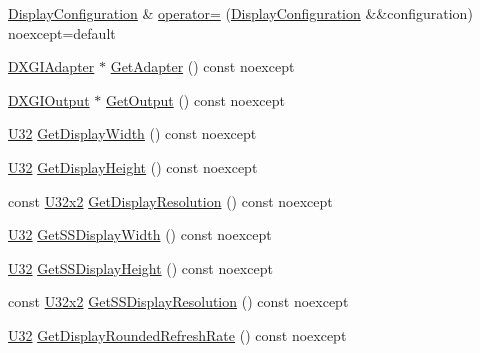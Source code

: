 \begin{DoxyCompactItemize}
\hyperlink{classmage_1_1rendering_1_1_display_configuration}{Display\+Configuration} \& \hyperlink{classmage_1_1rendering_1_1_display_configuration_a309591557673c77b7157012136fe2fc9}{operator=} (\hyperlink{classmage_1_1rendering_1_1_display_configuration}{Display\+Configuration} \&\&configuration) noexcept=default
\item 
\hyperlink{namespacemage_1_1rendering_ad55e028ebd705b547eeb972ad8d03b6a}{D\+X\+G\+I\+Adapter} $\ast$ \hyperlink{classmage_1_1rendering_1_1_display_configuration_a8516379377ff3f6cec7b2d705398459f}{Get\+Adapter} () const noexcept
\item 
\hyperlink{namespacemage_1_1rendering_aaf22d3893277a4bd8497f6ea69b01532}{D\+X\+G\+I\+Output} $\ast$ \hyperlink{classmage_1_1rendering_1_1_display_configuration_a727b2e5ebcc286bb2ae39fd1f1e69445}{Get\+Output} () const noexcept
\item 
\hyperlink{namespacemage_a41c104c036fba3756a74e19f793eeaa1}{U32} \hyperlink{classmage_1_1rendering_1_1_display_configuration_a4ceed88b5f46a87857cf0b2979badf46}{Get\+Display\+Width} () const noexcept
\item 
\hyperlink{namespacemage_a41c104c036fba3756a74e19f793eeaa1}{U32} \hyperlink{classmage_1_1rendering_1_1_display_configuration_aaf77044b835d6302305913cf469b7246}{Get\+Display\+Height} () const noexcept
\item 
const \hyperlink{namespacemage_a88e05bff0300120c013285d3dcad95c5}{U32x2} \hyperlink{classmage_1_1rendering_1_1_display_configuration_a1394352b2a3f80fb1cc24d96f744ae3c}{Get\+Display\+Resolution} () const noexcept
\item 
\hyperlink{namespacemage_a41c104c036fba3756a74e19f793eeaa1}{U32} \hyperlink{classmage_1_1rendering_1_1_display_configuration_aac42c90d563c8ee7a2ae795c2750dc35}{Get\+S\+S\+Display\+Width} () const noexcept
\item 
\hyperlink{namespacemage_a41c104c036fba3756a74e19f793eeaa1}{U32} \hyperlink{classmage_1_1rendering_1_1_display_configuration_a7bbb45919b9cd4ae20cc9f4cac8a7069}{Get\+S\+S\+Display\+Height} () const noexcept
\item 
const \hyperlink{namespacemage_a88e05bff0300120c013285d3dcad95c5}{U32x2} \hyperlink{classmage_1_1rendering_1_1_display_configuration_a1e55018800cb0c229571274c4f6c222c}{Get\+S\+S\+Display\+Resolution} () const noexcept
\item 
\hyperlink{namespacemage_a41c104c036fba3756a74e19f793eeaa1}{U32} \hyperlink{classmage_1_1rendering_1_1_display_configuration_a6650e981bf82c85d5339afbc37cee64a}{Get\+Display\+Rounded\+Refresh\+Rate} () const noexcept

\end{DoxyCompactItemize}
